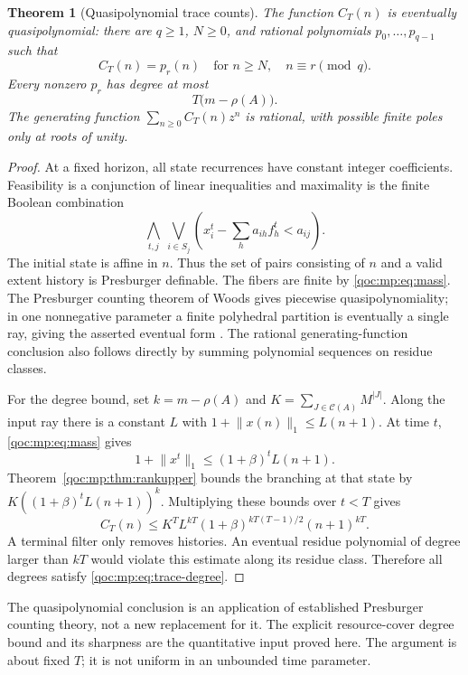 \documentclass[11pt,letterpaper]{article}
\newtheorem{theorem}{Theorem}[section]
\theoremstyle{definition}
\theoremstyle{remark}
\newcommand{\cC}{\mathcal C}
\newcommand{\size}[1]{\lVert #1\rVert_1}
\begin{document}
\begin{theorem}[Quasipolynomial trace counts]\label{qoc:mp:thm:quasi}
The function $C_T(n)$ is eventually quasipolynomial: there are $q\ge1$,
$N\ge0$, and rational polynomials $p_0,\ldots,p_{q-1}$ such that
\[
 C_T(n)=p_r(n)\quad\text{for }n\ge N,\quad n\equiv r\pmod q.
\]
Every nonzero $p_r$ has degree at most
\begin{equation}\label{qoc:mp:eq:trace-degree}
 T\bigl(m-\rho(A)\bigr).
\end{equation}
The generating function $\sum_{n\ge0}C_T(n)z^n$ is rational, with possible
finite poles only at roots of unity.
\end{theorem}
\begin{proof}
At a fixed horizon, all state recurrences have constant integer
coefficients. Feasibility is a conjunction of linear inequalities and
maximality is the finite Boolean combination
\[
 \bigwedge_{t,j}\ \bigvee_{i\in S_j}
 \left(x_i^t-\sum_h a_{ih}f_h^t<a_{ij}\right).
\]
The initial state is affine in $n$. Thus the set of pairs consisting of
$n$ and a valid extent history is Presburger definable. The fibers are
finite by \eqref{qoc:mp:eq:mass}. The Presburger counting theorem of Woods gives
piecewise quasipolynomiality; in one nonnegative parameter a finite
polyhedral partition is eventually a single ray, giving the asserted
eventual form \cite{mp:woods}. The rational generating-function conclusion
also follows directly by summing polynomial sequences on residue classes.

For the degree bound, set $k=m-\rho(A)$ and
$K=\sum_{J\in\cC(A)}M^{|J|}$. Along the input ray there is a constant
$L$ with $1+\size{x(n)}\le L(n+1)$. At time $t$,
\eqref{qoc:mp:eq:mass} gives
\[
 1+\size{x^t}\le (1+\beta)^tL(n+1).
\]
Theorem~\ref{qoc:mp:thm:rankupper} bounds the branching at that state by
$K((1+\beta)^tL(n+1))^k$. Multiplying these bounds over $t<T$ gives
\begin{equation}\label{qoc:mp:eq:trace-growth-explicit}
 C_T(n)\le K^T L^{kT}(1+\beta)^{kT(T-1)/2}(n+1)^{kT}.
\end{equation}
A terminal filter only removes histories. An eventual residue polynomial
of degree larger than $kT$ would violate this estimate along its residue
class. Therefore all degrees satisfy \eqref{qoc:mp:eq:trace-degree}.
\end{proof}

The quasipolynomial conclusion is an application of established
Presburger counting theory, not a new replacement for it. The explicit
resource-cover degree bound and its sharpness are the quantitative input
proved here. The argument is about fixed $T$; it is not uniform in an
unbounded time parameter.
\end{document}
